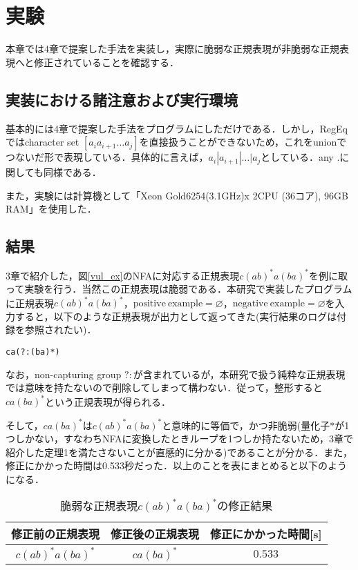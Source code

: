 \documentclass[a4paper, 12pt, dvipdfmx, uplatex]{jsreport}
\begin{document}
\chapter{実験}
本章では4章で提案した手法を実装し，実際に脆弱な正規表現が非脆弱な正規表現へと修正されていることを確認する．

\section{実装における諸注意および実行環境}
基本的には4章で提案した手法をプログラムにしただけである．しかし，RegEqではcharacter set $[a_ia_{i+1}\ldots a_j]$を直接扱うことができないため，これをunionでつないだ形で表現している．具体的に言えば，$a_i|a_{i+1}|\ldots|a_j$としている．any $.$に関しても同様である．

また，実験には計算機として「Xeon Gold6254(3.1GHz)x 2CPU (36コア), 96GB RAM」を使用した．

\section{結果}
3章で紹介した，図\ref{vul_ex}のNFAに対応する正規表現$c(ab)^*a(ba)^*$を例に取って実験を行う．当然この正規表現は脆弱である．本研究で実装したプログラムに正規表現$c(ab)^*a(ba)^*$，$\mathrm{positive \ example}=\varnothing$，$\mathrm{negative \ example}=\varnothing$を入力すると，以下のような正規表現が出力として返ってきた(実行結果のログは付録を参照されたい)．
\begin{lstlisting}[caption=$c(ab)^*a(ba)^*$を非脆弱化した正規表現,label=number]
ca(?:(ba)*)
\end{lstlisting}
なお，non-capturing group $?:$が含まれているが，本研究で扱う純粋な正規表現では意味を持たないので削除してしまって構わない．従って，整形すると$ca(ba)^*$という正規表現が得られる．

そして，$ca(ba)^*$は$c(ab)^*a(ba)^*$と意味的に等価で，かつ非脆弱(量化子$*$が1つしかない，すなわちNFAに変換したときループを1つしか持たないため，3章で紹介した定理1を満たさないことが直感的に分かる)であることが分かる．また，修正にかかった時間は0.533秒だった．以上のことを表にまとめると以下のようになる．

\begin{table}[H]
  \centering
  \caption{脆弱な正規表現$c(ab)^*a(ba)^*$の修正結果\label{vul_res1}}
  \begin{tabular}{c|c|c} \hline \hline
      修正前の正規表現 & 修正後の正規表現  & 修正にかかった時間[s]\\\hline
      $c(ab)^*a(ba)^*$  & $ca(ba)^*$ &$0.533$ \\\hline
  \end{tabular}
\end{table}
\end{document}
